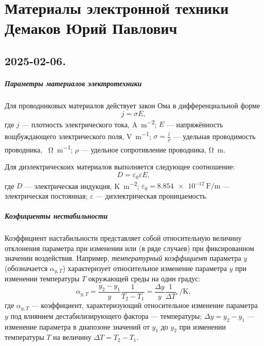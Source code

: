 \part[Материалы электронной техники]{
Материалы электронной техники \\
{\Large Демаков Юрий Павлович}
}

\chapter{2025-02-06. }

\subsubsection{Параметры материалов электротехники}

Для проводниковых материалов действует закон Ома в дифференциальной форме
\[
	j = \sigma E
	,\]
где $j$ --- плотность электрического тока, \unit{\ampere\per\square\meter}; $E$
--- напряжённость вощбуждающего электрического поля, \unit{\volt\per\meter};
$\sigma = \frac{l}{\rho}$ --- удельная проводимость проводника,
\unit{\per\ohm\per\meter}; $\rho$ --- удельное сопротивление проводника,
\unit{\ohm\meter}.

Для диэлектрическоих материалов выполняется следующее соотношение:
\[
	D = \varepsilon_0 \varepsilon E
	,\]
где $D$ --- электрическая индукция, \unit{\kelvin\per\square\meter};
$\varepsilon_0 = \qty{8.854e-12}{\farad\per\meter}$ --- электрическая
постоянная; $\varepsilon$ --- диэлектрическая проницаемость.

\subsubsection{Коэфициенты нестабильности}

Коэффициент настабильности представляет собой относительную величину отклонения
параметра при изменении или (в ряде случаев) при фиксированном значении
воздействия. Например, \emph{температурный коэффициент} параметра $y$
(обозначается $\alpha_{y, T}$) характеризует относительное изменение параметра
$y$ при изменении температуры $T$ окружающей среды на один градус:
\[
	\alpha_{y, T} = \frac{y_2 - y_1}{y} \frac{1}{T_2 - T_1} = \frac{\Delta y}{y}
	\frac{1}{\Delta T}, \unit{\per\kelvin}
	,\]
где $\alpha_{y,T}$ --- коэффициент, характеризующий относительное изменение
параметра $y$ под влиянием дестабилизирующего фактора --- температуры; $\Delta y
	= y_2 - y_1$ --- изменение параметра в диапозоне значений от $y_1$ до $y_2$ при
изменении температуры $T$ на величину $\Delta T = T_2 - T_1$.

